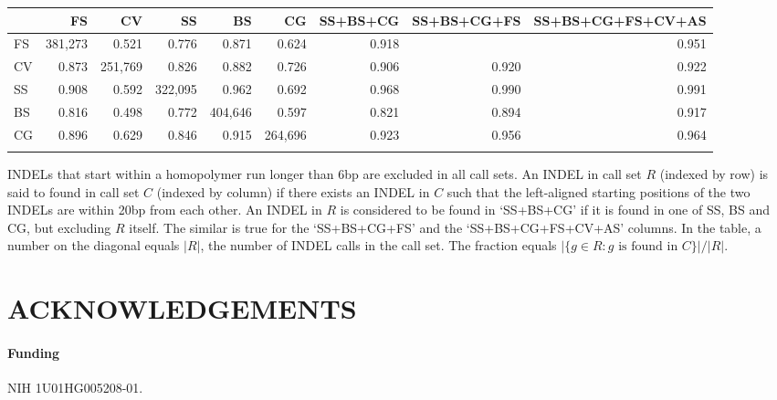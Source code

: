 \documentclass{bioinfo}
\begin{document}

\begin{table*}[!htb]
{\begin{tabular*}{\textwidth}{@{\extracolsep{\fill}}lrrrrrrrr}
\toprule
&FS&CV&SS&BS&CG&SS+BS+CG&SS+BS+CG+FS&SS+BS+CG+FS+CV+AS\\
\midrule
FS&381,273& 0.521 & 0.776 & 0.871 & 0.624 & 0.918 &       & 0.951\\
CV& 0.873 &251,769& 0.826 & 0.882 & 0.726 & 0.906 & 0.920 & 0.922\\
SS& 0.908 & 0.592 &322,095& 0.962 & 0.692 & 0.968 & 0.990 & 0.991\\
BS& 0.816 & 0.498 & 0.772 &404,646& 0.597 & 0.821 & 0.894 & 0.917\\
CG& 0.896 & 0.629 & 0.846 & 0.915 &264,696& 0.923 & 0.956 & 0.964\\
\botrule
\end{tabular*}}
{INDELs that start within a homopolymer run longer than 6bp are excluded in
all call sets. An INDEL in call set $R$ (indexed by row) is said to
found in call set $C$ (indexed by column) if there exists an INDEL in $C$
such that the left-aligned starting positions of the two INDELs are within 20bp
from each other.  An INDEL in $R$ is considered to be found in
`\mbox{SS+BS+CG}' if it is found in one of SS, BS and CG, but excluding $R$
itself. The similar is true for the `\mbox{SS+BS+CG+FS}' and the
`\mbox{SS+BS+CG+FS+CV+AS}' columns. In the table, a number on the diagonal equals $|R|$,
the number of INDEL calls in the call set. The fraction equals $|\{g\in R:g
\mbox{ is found in } C\}|/|R|$.}

\end{table*}

\section*{ACKNOWLEDGEMENTS}

\paragraph{Funding\textcolon} NIH 1U01HG005208-01.

\end{document}
